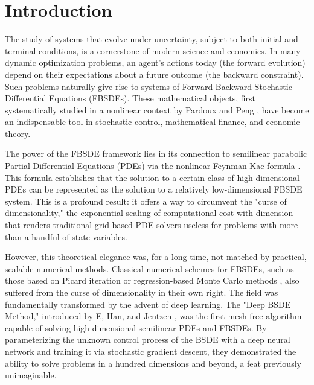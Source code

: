\documentclass[11pt,letterpaper,oneside]{article}
\theoremstyle{plain}
\theoremstyle{definition}
\theoremstyle{remark}
\begin{document}
\vspace{1em}

{\hypersetup{linkcolor=distillDarkGray}
\tableofcontents
}

\newpage


\section{Introduction}
\label{sec:introduction}

The study of systems that evolve under uncertainty, subject to both initial and terminal conditions, is a cornerstone of modern science and economics. In many dynamic optimization problems, an agent's actions today (the forward evolution) depend on their expectations about a future outcome (the backward constraint). Such problems naturally give rise to systems of Forward-Backward Stochastic Differential Equations (FBSDEs). These mathematical objects, first systematically studied in a nonlinear context by Pardoux and Peng \cite{PardouxPeng1990}, have become an indispensable tool in stochastic control, mathematical finance, and economic theory.

The power of the FBSDE framework lies in its connection to semilinear parabolic Partial Differential Equations (PDEs) via the nonlinear Feynman-Kac formula \cite{PardouxPeng1992}. This formula establishes that the solution to a certain class of high-dimensional PDEs can be represented as the solution to a relatively low-dimensional FBSDE system. This is a profound result: it offers a way to circumvent the "curse of dimensionality," the exponential scaling of computational cost with dimension that renders traditional grid-based PDE solvers useless for problems with more than a handful of state variables.

However, this theoretical elegance was, for a long time, not matched by practical, scalable numerical methods. Classical numerical schemes for FBSDEs, such as those based on Picard iteration or regression-based Monte Carlo methods \cite{Gobet2005, BenderSteiner2012}, also suffered from the curse of dimensionality in their own right. The field was fundamentally transformed by the advent of deep learning. The "Deep BSDE Method," introduced by E, Han, and Jentzen \cite{EHanJentzen2017}, was the first mesh-free algorithm capable of solving high-dimensional semilinear PDEs and FBSDEs. By parameterizing the unknown control process of the BSDE with a deep neural network and training it via stochastic gradient descent, they demonstrated the ability to solve problems in a hundred dimensions and beyond, a feat previously unimaginable.
\end{document}
